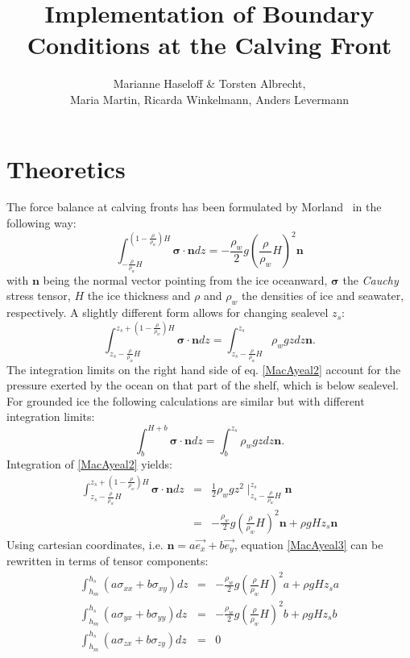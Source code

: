 \documentclass[a4paper,10pt]{article}
\title{Implementation of Boundary Conditions at the Calving Front}
\author{Marianne Haseloff \& Torsten Albrecht,\\ Maria Martin, Ricarda Winkelmann, Anders Levermann}
\begin{document}
\maketitle
\section{Theoretics}
The force balance at calving fronts has been formulated by Morland~\cite{Morland87} in the following way:
\begin{equation}%
\int_{-\frac{\rho}{\rho_w}H}^{(1-\frac{\rho}{\rho_w})H}\mathbf{\sigma}\cdot\mathbf{n}dz = -\frac{\rho_w}{2}g\left(\frac{\rho}{\rho_w}H \right)^2\mathbf{n}
\label{MacAyeal1}
\end{equation}
with $\mathbf{n}$ being the normal vector pointing from the ice
oceanward, $\mathbf{\sigma}$ the \emph{Cauchy} stress tensor, $H$ the ice thickness and $\rho$ and $\rho_{w}$ the densities of ice and seawater, respectively. A slightly different form allows for changing sealevel $z_s$:
\begin{equation}
\int_{z_s-\frac{\rho}{\rho_w}H}^{z_s+(1-\frac{\rho}{\rho_w})H}\mathbf{\sigma}\cdot\mathbf{n}dz = \int_{z_s-\frac{\rho}{\rho_w}H}^{z_s}\rho_w g z dz\mathbf{n}.
\label{MacAyeal2}
\end{equation}
The integration limits on the right hand side of eq. \eqref{MacAyeal2} account for the pressure exerted by the ocean on that part of the shelf, which is below sealevel. For grounded ice the following calculations are similar but with different integration limits:
\begin{equation}
\int_{b}^{H+b}\mathbf{\sigma}\cdot\mathbf{n}dz = \int_{b}^{z_s}\rho_w g z dz\mathbf{n}.
\label{BC_sheet}
\end{equation} 
Integration of \eqref{MacAyeal2} yields:
\begin{eqnarray}
\int_{z_s-\frac{\rho}{\rho_w}H}^{z_s+(1-\frac{\rho}{\rho_w})H}\mathbf{\sigma}\cdot\mathbf{n}dz & = & \frac{1}{2}\rho_w g z^2\mid_{z_s-\frac{\rho}{\rho_w}H}^{z_s}\mathbf{n} \\
& = &  -\frac{\rho_w}{2}g\left(\frac{\rho}{\rho_w}H \right)^2\mathbf{n} + \rho gHz_s\mathbf{n} \label{MacAyeal3} 
\end{eqnarray}
\noindent Using cartesian coordinates,
i.e. $\mathbf{n}=a\overrightarrow{e_x}+b\overrightarrow{e_y}$, equation
\eqref{MacAyeal3} can be rewritten in terms of tensor components:
\begin{eqnarray*}
\int_{h_m}^{h_s}(a\sigma_{xx}+b\sigma_{xy})dz & = & -\frac{\rho_w}{2}g\left(\frac{\rho}{\rho_w}H\right)^2a  + \rho gHz_sa \\
\int_{h_m}^{h_s}(a\sigma_{yx}+b\sigma_{yy})dz & = & -\frac{\rho_w}{2}g\left(\frac{\rho}{\rho_w}H\right)^2b + \rho gHz_sb  \\
\int_{h_m}^{h_s}(a\sigma_{zx}+b\sigma_{zy})dz & = & 0
\end{eqnarray*}
\end{document}
